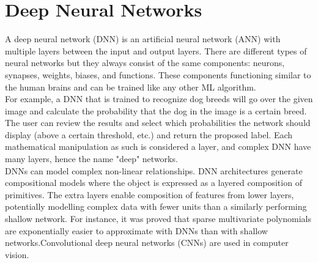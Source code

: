 \documentclass[12pt,a4paper]{article}
\begin{document}
\section{Deep Neural Networks}
A deep neural network (DNN) is an artificial neural network (ANN) with multiple layers between the input and output layers. There are different types of neural networks but they always consist of the same components: neurons, synapses, weights, biases, and functions. These components functioning similar to the human brains and can be trained like any other ML algorithm.\\
For example, a DNN that is trained to recognize dog breeds will go over the given image and calculate the probability that the dog in the image is a certain breed. The user can review the results and select which probabilities the network should display (above a certain threshold, etc.) and return the proposed label. Each mathematical manipulation as such is considered a layer, and complex DNN have many layers, hence the name "deep" networks.\\
DNNs can model complex non-linear relationships. DNN architectures generate compositional models where the object is expressed as a layered composition of primitives. The extra layers enable composition of features from lower layers, potentially modelling complex data with fewer units than a similarly performing shallow network. For instance, it was proved that sparse multivariate polynomials are exponentially easier to approximate with DNNs than with shallow networks.Convolutional deep neural networks (CNNs) are used in computer vision.
\end{document}
